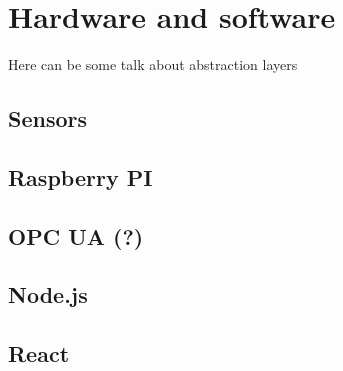 \chapter{Hardware and software}
 {
  \color{red}
  Here can be some talk about abstraction layers
 }
\section{Sensors}
\section{Raspberry PI}
\section{OPC UA (?)}
\section{Node.js}
\section{React}
